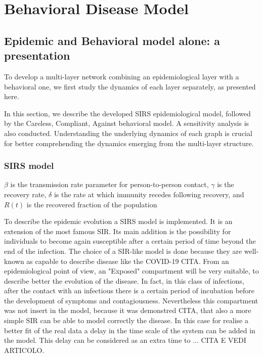 \part{Behavioral Disease Model}
\label{part:the_model}
\chapter{Epidemic and Behavioral model alone: a presentation}
\label{ch:model_alone}


To develop a multi-layer network combining an epidemiological layer with a behavioral one, we first study the dynamics of each layer separately, as presented here. 

In this section, we describe the developed SIRS epidemiological model, followed by the Careless, Compliant, Against behavioral model. A sensitivity analysis is also conducted. Understanding the underlying dynamics of each graph is crucial for better comprehending the dynamics emerging from the multi-layer structure.


\section{SIRS model}
\label{sec:SIRS}

$\beta$ is the transmission rate parameter for person-to-person
contact, $\gamma$ is the recovery rate, $\delta$ is the rate at which
immunity recedes following recovery, and $R(t)$ is the recovered
fraction of the population

To describe the epidemic evolution a  SIRS model is implemented. It is an extension of the most famous SIR. Its main addition is the possibility for individuals to become again susceptible after a certain period of time beyond the end of the infection. The choice of a SIR-like model is done because they are well-known as capable to describe disease like the COVID-19 CITA. From an epidemiological point of view, an "Exposed" compartment will be very suitable, to describe better the evolution of the disease. In fact, in this class of infections, after the contact with an infectious there is a certain period of incubation before the development of symptoms and contagiousness. Nevertheless this compartment was not insert in the model, because it was demonstred CITA, that also a more simple SIR can be able to model correctly the disease. In this case for realise a better fit of the real data a delay in the time scale of the system can be added in the model. This delay can be considered as an extra time to ... CITA E VEDI ARTICOLO.

